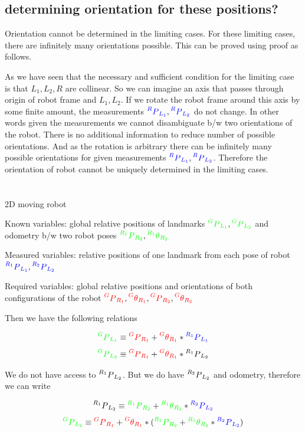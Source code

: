 \documentclass[12pt]{article}
\newcommand{\xpy}[2]{\prescript{#1}{}{P}_{#2}}
\newcommand{\rxpy}[2]{{\color{red} \prescript{#1}{}{P}_{#2}}}
\newcommand{\gxpy}[2]{{\color{green} \prescript{#1}{}{P}_{#2}}}
\newcommand{\bxpy}[2]{{\color{blue} \prescript{#1}{}{P}_{#2}}}
\newcommand{\rxoy}[2]{{\color{red} \prescript{#1}{}{\theta}_{#2}}}
\newcommand{\gxoy}[2]{{\color{green} \prescript{#1}{}{\theta}_{#2}}}
\begin{document}
\subsection*{determining orientation for these positions?}
Orientation cannot be determined in the limiting cases.
For these limiting cases, there are infinitely many orientations possible.
This can be proved using proof as follows.

As we have seen that the necessary and sufficient condition for the limiting case is that $L_1, L_2, R$ are collinear.
So we can imagine an axis that passes through origin of robot frame and $ L_1, L_2 $.
If we rotate the robot frame around this axis by some finite amount, the measurements $ \bxpy{R}{L_1}, \bxpy{R}{L_2} $ do not change.
In other words given the measurements we cannot disambiguate b/w two orientations of the robot.
There is no additional information to reduce number of possible orientations.
And as the rotation is arbitrary there can be infinitely many possible orientations for given measurements $ \bxpy{R}{L_1}, \bxpy{R}{L_2} $.
Therefore the orientation of robot cannot be uniquely determined in the limiting cases.

\pagebreak

\section{}
2D moving robot

Known variables: global relative positions of landmarks $ \gxpy{G}{L_1}, \gxpy{G}{L_2} $ and odometry b/w two robot poses {\color{green} $ \gxpy{R_1}{R_2}, \gxoy{R_1}{R_2} $ }

Measured variables: relative positions of one landmark from each pose of robot {\color{blue} $ \bxpy{R_1}{L_1}, \bxpy{R_2}{L_2} $ }

Required variables: global relative positions and orientations of both configurations of the robot {\color{red} $ \rxpy{G}{R_1}, \rxoy{G}{R_1}, \rxpy{G}{R_2}, \rxoy{G}{R_2} $}

Then we have the following relations

\[
  \gxpy{G}{L_1} \equiv \rxpy{G}{R_1} + \rxoy{G}{R_1} * \bxpy{R_1}{L_1}
\]
\[
  \gxpy{G}{L_2} \equiv \rxpy{G}{R_1} + \rxoy{G}{R_1} * \xpy{R_1}{L_2}
\]

We do not have access to $ \xpy{R_1}{L_2} $. But we do have $ \xpy{R_2}{L_2} $ and odometry, therefore we can write

\[
  \xpy{R_1}{L_2} \equiv \gxpy{R_1}{R_2} + \gxoy{R_1}{R_2} * \bxpy{R_2}{L_2}
\]
\[
  \gxpy{G}{L_2} \equiv \rxpy{G}{R_1} + \rxoy{G}{R_1} * (\gxpy{R_1}{R_2} + \gxoy{R_1}{R_2} * \bxpy{R_2}{L_2})
\]
\end{document}
